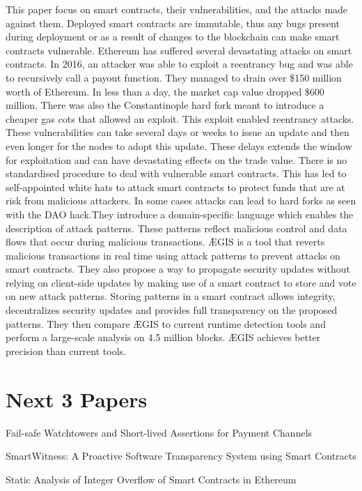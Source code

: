 \documentclass{article}
\begin{document}
This paper focus on smart contracts, their vulnerabilities, and the attacks made against them. Deployed smart contracts are immutable, thus any bugs present during deployment or as a result of changes to the blockchain can make smart contracts vulnerable. Ethereum has suffered several devastating attacks on smart contracts. In 2016, an attacker was able to exploit a reentrancy bug and was able to recursively call a payout function. They managed to drain over \$150 million worth of Ethereum. In less than a day, the market cap value dropped \$600 million. There was also the Constantinople hard fork meant to introduce a cheaper gas cots that allowed an exploit. This exploit enabled reentrancy attacks. These vulnerabilities can take several days or weeks to issue an update and then even longer for the nodes to adopt this update. These delays extends the window for exploitation and can have devastating effects on the trade value. There is no standardised procedure to deal with vulnerable smart contracts. This has led to self-appointed white hats to attack smart contracts to protect funds that are at risk from malicious attackers. In some cases attacks can lead to hard forks as seen with the DAO hack.They introduce a domain-specific language which enables the description of attack patterns. These patterns reflect malicious control and data flows that occur during malicious transactions. ÆGIS is a tool that reverts malicious transactions in real time using attack patterns to prevent attacks on smart contracts. They also propose a way to propagate security updates without relying on client-side updates by making use of a smart contract to store and vote on new attack patterns. Storing patterns in a smart contract allows integrity, decentralizes security updates and provides full transparency on the proposed patterns. They then compare ÆGIS to current runtime detection tools and perform a large-scale analysis on 4.5 million blocks. ÆGIS achieves better precision than current tools. 

\section{Next 3 Papers}
\item Fail-safe Watchtowers and Short-lived Assertions for Payment Channels
\item SmartWitness: A Proactive Software Transparency System using Smart Contracts
\item Static Analysis of Integer Overflow of Smart Contracts in Ethereum

\printbibliography
\end{document}
